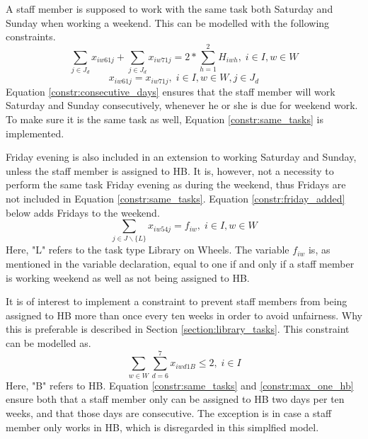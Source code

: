 A staff member is supposed to work with the same task both Saturday and Sunday when working a weekend. This can be modelled with the following constraints.
\begin{equation} \label{constr:consecutive_days}
\sum_{j \in J_d} x_{iw61j} + \sum_{j \in J_d} x_{iw71j} = 2*\sum_{h = 1}^{2} H_{iwh}, \;   i\in I, w \in W
\end{equation}
\begin{equation} \label{constr:same_tasks}
x_{iw61j} = x_{iw71j}, \;   i\in I, w \in W, j \in J_d
\end{equation}
Equation \ref{constr:consecutive_days} ensures that the staff member will work Saturday and Sunday consecutively, whenever he or she is due for weekend work. To make sure it is the same task as well, Equation \ref{constr:same_tasks} is implemented.

Friday evening is also included in an extension to working Saturday and Sunday, unless the staff member is assigned to HB. It is, however, not a necessity to perform the same task Friday evening as during the weekend, thus Fridays are not included in Equation \ref{constr:same_tasks}. Equation \ref{constr:friday_added} below adds Fridays to the weekend.
\begin{equation} \label{constr:friday_added}
\sum_{j \in J \backslash \{L\}}x_{iw54j} = f_{iw}, \;   i \in I, w \in W
\end{equation}
Here, "L" refers to the task type Library on Wheels. The variable $f_{iw}$ is, as mentioned in the variable declaration, equal to one if and only if a staff member is working weekend as well as not being assigned to HB.

It is of interest to implement a constraint to prevent staff members from being assigned to HB more than once every ten weeks in order to avoid unfairness. Why this is preferable is described in Section \ref{section:library_tasks}. This constraint can be modelled as.
\begin{equation} \label{constr:max_one_hb}
\sum_{w \in W}\sum_{d = 6}^{7}x_{iwd1B} \leq 2, \;   i \in I
\end{equation}
Here, "B" refers to HB. Equation \ref{constr:same_tasks} and \ref{constr:max_one_hb} ensure both that a staff member only can be assigned to HB two days per ten weeks, and that those days are consecutive. The exception is in case a staff member only works in HB, which is disregarded in this simplfied model.


